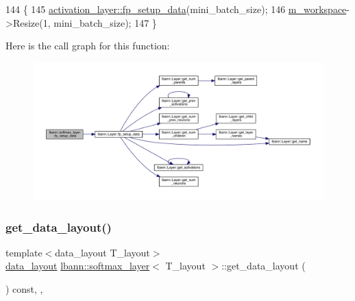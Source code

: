\begin{DoxyCode}
144                                                    \{
145     \hyperlink{classlbann_1_1Layer_af311d901a5f71e4c749454647e9fd9c7}{activation\_layer::fp\_setup\_data}(mini\_batch\_size);
146     \hyperlink{classlbann_1_1softmax__layer_a604e614de25758f0072308c7efdd5bdb}{m\_workspace}->Resize(1, mini\_batch\_size);
147   \}
\end{DoxyCode}
Here is the call graph for this function\+:\nopagebreak
\begin{figure}[H]
\begin{center}
\leavevmode
\includegraphics[width=350pt]{classlbann_1_1softmax__layer_a313aa2f82acfbca8f3852378d00c22c3_cgraph}
\end{center}
\end{figure}
\mbox{\label{classlbann_1_1softmax__layer_af45bc0942bf38d6de7c28032d9bb0e73}} 
\subsubsection{\texorpdfstring{get\+\_\+data\+\_\+layout()}{get\_data\_layout()}}
{\footnotesize\ttfamily template$<$data\+\_\+layout T\+\_\+layout$>$ \\
\hyperlink{base_8hpp_a786677cbfb3f5677b4d84f3056eb08db}{data\+\_\+layout} \hyperlink{classlbann_1_1softmax__layer}{lbann\+::softmax\+\_\+layer}$<$ T\+\_\+layout $>$\+::get\+\_\+data\+\_\+layout (\begin{DoxyParamCaption}{ }\end{DoxyParamCaption}) const\hspace{0.3cm}{\ttfamily [inline]}, {\ttfamily [override]}, {\ttfamily [virtual]}}

